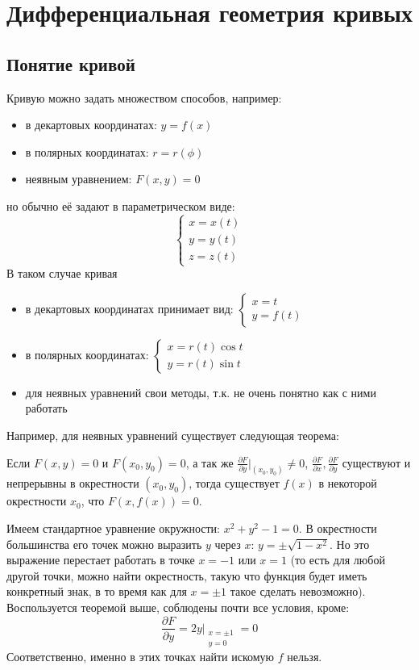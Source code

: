 \documentclass[main]{subfiles}
\begin{document}
\part{Дифференциальная геометрия кривых}
\chapter{Понятие кривой} 
Кривую можно задать множеством способов, например:
\begin{itemize}
    \item в декартовых координатах: $y = f(x)$
    \item в полярных координатах: $r = r(\phi)$
    \item неявным уравнением: $F(x,y) = 0$
\end{itemize}
но обычно её задают в параметрическом виде:
\[\begin{cases}
        x = x(t) \\
        y = y(t) \\
        z = z(t)
    \end{cases}\]
В таком случае кривая
\begin{itemize}
    \item в декартовых координатах принимает вид: $\displaystyle\begin{cases}
                  x = t \\
                  y = f(t)
              \end{cases}$
    \item в полярных координатах: $\displaystyle \begin{cases}
                  x = r(t) \cos t \\
                  y = r(t) \sin t
              \end{cases}$
    \item для неявных уравнений свои методы, т.к. не очень понятно как с ними работать
\end{itemize}

Например, для неявных уравнений существует следующая теорема:
\begin{theorem*}
    Если $F(x,y) = 0$ и $F(x_0, y_0) = 0$,
    а так же $\frac{\partial F}{\partial y}\rvert_{(x_0, y_0)} \neq 0$,
    $\frac{\partial F}{\partial x}, \frac{\partial F}{\partial y}$ существуют и непрерывны в окрестности $(x_0, y_0)$,
    тогда существует $f(x)$ в некоторой окрестности $x_0$, что $F(x, f(x)) =0$.
\end{theorem*}
\begin{example}
    Имеем стандартное уравнение окружности: $x^2 + y^2 -1 =0$.
    В окрестности большинства его точек можно выразить $y$ через $x$: $y = \pm \sqrt{1-x^2}$.
    Но это выражение перестает работать в точке $x=-1$ или $x=1$
    (то есть для любой другой точки, можно найти окрестность, такую что функция будет иметь конкретный знак, в то время как для $x= \pm 1$ такое сделать невозможно).
    Воспользуется теоремой выше, соблюдены почти все условия, кроме:
    \[\frac{\partial F}{\partial y} = 2y\rvert_{\substack{x = \pm 1\\ y=0}} = 0\]
    Соответственно, именно в этих точках найти искомую $f$ нельзя.
\end{example}
\end{document}
